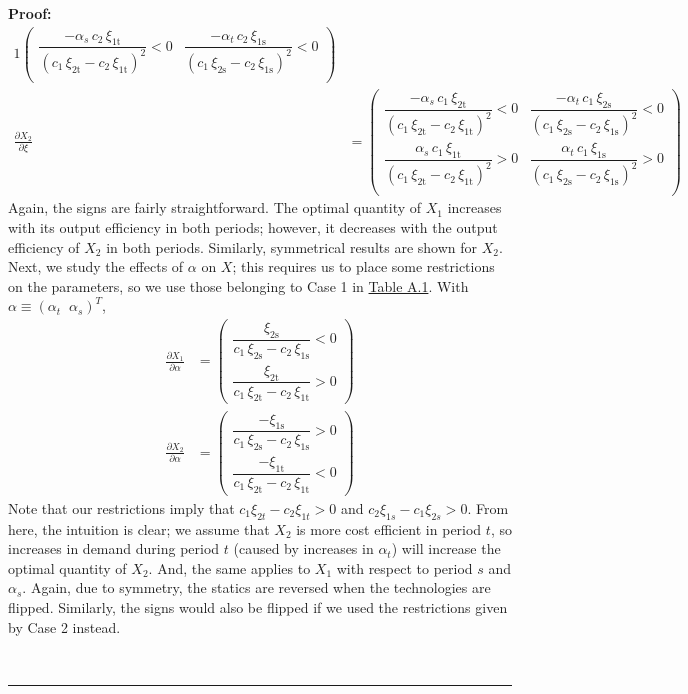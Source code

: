 \documentclass[11pt,a4paper]{extarticle}
\newenvironment{proof}[1][Proof]{\noindent\textbf{#1:} }{\ \rule{0.5em}{0.5em}}
\begin{document}
\begin{proof}
\begin{alignat*}{1}
\begin{pmatrix}
	\dfrac{-\alpha _{s}\,c_{2}\,\xi _{\mathrm{1t}}}{{\left(c_{1}\,\xi _{\mathrm{2t}}-c_{2}\,\xi _{\mathrm{1t}}\right)}^2}<0 & \dfrac{-\alpha _{t}\,c_{2}\,\xi _{\mathrm{1s}}}{{\left(c_{1}\,\xi _{\mathrm{2s}}-c_{2}\,\xi _{\mathrm{1s}}\right)}^2}<0 \\
	\end{pmatrix}\\
	\frac{\partial X_2}{\partial \xi} &= 
	\begin{pmatrix}
	\dfrac{-\alpha _{s}\,c_{1}\,\xi _{\mathrm{2t}}}{{\left(c_{1}\,\xi _{\mathrm{2t}}-c_{2}\,\xi _{\mathrm{1t}}\right)}^2} <0& \dfrac{-\alpha _{t}\,c_{1}\,\xi _{\mathrm{2s}}}{{\left(c_{1}\,\xi _{\mathrm{2s}}-c_{2}\,\xi _{\mathrm{1s}}\right)}^2} <0\\
	\dfrac{\alpha _{s}\,c_{1}\,\xi _{\mathrm{1t}}}{{\left(c_{1}\,\xi _{\mathrm{2t}}-c_{2}\,\xi _{\mathrm{1t}}\right)}^2}>0& \dfrac{\alpha _{t}\,c_{1}\,\xi _{\mathrm{1s}}}{{\left(c_{1}\,\xi _{\mathrm{2s}}-c_{2}\,\xi _{\mathrm{1s}}\right)}^2} >0\\
	\end{pmatrix}
	\end{alignat*}
	Again, the signs are fairly straightforward. The optimal quantity of $X_1$ increases with its output efficiency in both periods; however, it decreases with the output efficiency of $X_2$ in both periods. Similarly, symmetrical results are shown for $X_2$. Next, we study the effects of $\alpha$ on $X$; this requires us to place some restrictions on the parameters, so we use those belonging to Case 1 in \hyperref[tab:paramrest]{Table A.1}. With $\alpha \equiv \left( \alpha_t \;\; \alpha_s \right)^T$, 
	\begin{align*}
	\frac{\partial X_1}{\partial \alpha} &= 
	\begin{pmatrix}
	\dfrac{\xi _{\mathrm{2s}}}{c_{1}\,\xi _{\mathrm{2s}}-c_{2}\,\xi _{\mathrm{1s}}}<0 \\
	\dfrac{\xi _{\mathrm{2t}}}{c_{1}\,\xi _{\mathrm{2t}}-c_{2}\,\xi _{\mathrm{1t}}}>0
	\end{pmatrix}\\
	\frac{\partial X_2}{\partial \alpha} &= 
	\begin{pmatrix}
	\dfrac{-\xi _{\mathrm{1s}}}{c_{1}\,\xi _{\mathrm{2s}}-c_{2}\,\xi _{\mathrm{1s}}}>0 \\
	\dfrac{-\xi _{\mathrm{1t}}}{c_{1}\,\xi _{\mathrm{2t}}-c_{2}\,\xi _{\mathrm{1t}}}<0
	\end{pmatrix}
	\end{align*}
	Note that our restrictions imply that $c_1 \xi_{2t} - c_2 \xi_{1t} > 0$ and $c_2 \xi_{1s} - c_1 \xi_{2s} > 0$. From here, the intuition is clear; we assume that $X_2$ is more cost efficient in period $t$, so increases in demand during period $t$ (caused by increases in $\alpha_t$) will increase the optimal quantity of $X_2$. And, the same applies to $X_1$ with respect to period $s$ and $\alpha_s$. Again, due to symmetry, the statics are reversed when the technologies are flipped. Similarly, the signs would also be flipped if we used the restrictions given by Case 2 instead. 
	

\end{proof}
\end{document}
